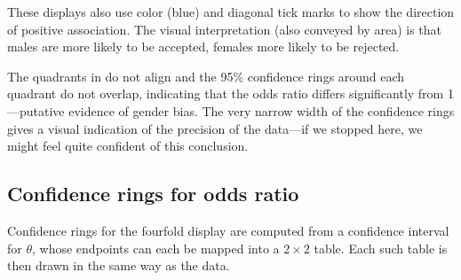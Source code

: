 \documentclass[10pt,krantz2]{krantz}\usepackage[]{graphicx}\usepackage[]{color}
\begin{document}
These displays also use color (blue) and diagonal tick marks
to show the direction of positive association. The visual interpretation
(also conveyed by area) is that males are more likely to be accepted,
females more likely to be rejected.

The quadrants in  do not align and
the 95\% confidence rings around each quadrant do not overlap,
indicating that the odds ratio differs significantly from 1---putative
evidence of gender bias.  The very narrow
width of the confidence rings gives a visual indication of the
precision of the data---if we stopped here, we might feel quite confident of this conclusion.

\subsection{Confidence rings for odds ratio}
Confidence rings for the fourfold display are computed from a
confidence interval for \(\theta\), whose endpoints can each be
mapped into a \(2 \times  2\) table.  Each such table is then drawn
in the same way as the data.
\end{document}
